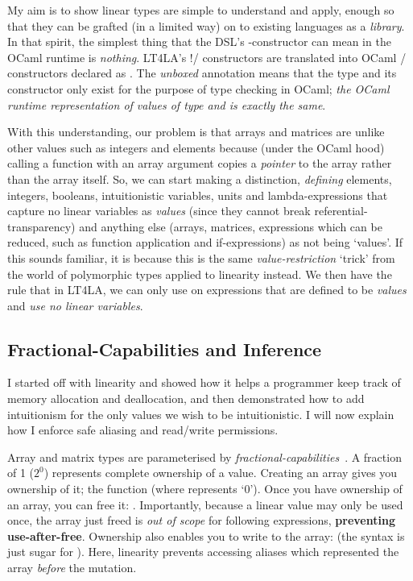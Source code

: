 My aim is to show linear types are simple to understand and apply, enough so
that they can be grafted (in a limited way) on to existing languages as a
\emph{library}. In that spirit, the simplest thing that the DSL's
-constructor can mean in the OCaml runtime is \emph{nothing}.
LT4LA's !/ constructors are translated into OCaml
/ constructors declared as .  The \emph{unboxed} annotation means that the type and its
constructor only exist for the purpose of type checking in OCaml; \emph{the
OCaml runtime representation of values of type  and 
is exactly the same}.

With this understanding, our problem is that arrays and matrices are unlike
other values such as integers and elements because (under the OCaml hood)
calling a function with an array argument copies a \emph{pointer} to the array
rather than the array itself. So, we can start making a distinction,
\emph{defining} elements, integers, booleans, intuitionistic variables, units
and lambda-expressions that capture no linear variables as \emph{values} (since
they cannot break referential-transparency) and anything else (arrays,
matrices, expressions which can be reduced, such as function application and
if-expressions) as not being `values'. If this sounds familiar, it is because
this is the same \emph{value-restriction} `trick' from the world of polymorphic
types applied to linearity instead. We then have the rule that in LT4LA, we can
only use  on expressions that are defined to be \emph{values} and
\emph{use no linear variables}.

\subsection{Fractional-Capabilities and Inference}

I started off with linearity and showed how it helps a programmer keep track
of memory allocation and deallocation, and then demonstrated how to add
intuitionism for the only values we wish to be intuitionistic. I will now
explain how I enforce safe aliasing and read/write permissions.

Array and matrix types are parameterised by
\emph{fractional-capabilities}~\cite{boyland}.  A fraction of 1 ($2^0$)
represents complete ownership of a value. Creating an array gives you ownership
of it; the function  (where  represents
`0').  Once you have ownership of an array, you can free it: .  Importantly, because a linear value may only be used once, the
array just freed is \emph{out of scope} for following expressions,
\textbf{preventing use-after-free}.  Ownership also enables you to write to the
array:  (the syntax  is just sugar for ). Here, linearity prevents accessing
aliases which represented the array \emph{before} the mutation.

